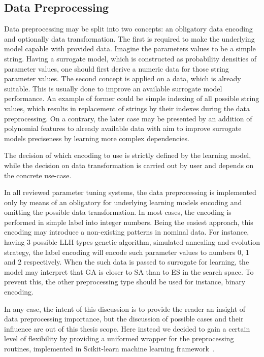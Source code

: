 \subsection{Data Preprocessing}\label{impl: preprocessing}
Data preprocessing may be split into two concepts: an obligatory data encoding and optionally data transformation. The first is required to make the underlying model capable with provided data. Imagine the parameters values to be a simple string. Having a surrogate model, which is constructed as probability densities of parameter values, one should first derive a numeric data for those string parameter values. The second concept is applied on a data, which is already suitable. This is usually done to improve an available surrogate model performance. An example of former could be simple indexing of all possible string values, which results in replacement of strings by their indexes during the data preprocessing. On a contrary, the later case may be presented by an addition of polynomial features to already available data with aim to improve surrogate models preciseness by learning more complex dependencies.

The decision of which encoding to use is strictly defined by the learning model, while the decision on data transformation is carried out by user and depends on the concrete use-case.

In all reviewed parameter tuning systems, the data preprocessing is implemented only by means of an obligatory for underlying learning models encoding and omitting the possible data transformation. In most cases, the encoding is performed in simple label into integer numbers. Being the easiest approach, this encoding may introduce a non-existing patterns in nominal data. For instance, having 3 possible LLH types genetic algorithm, simulated annealing and evolution strategy, the label encoding will encode such parameter values to numbers 0, 1 and 2 respectively. When the such data is passed to surrogate for learning, the model may interpret that GA is closer to SA than to ES in the search space. To prevent this, the other preprocessing type should be used for instance, binary encoding.

In any case, the intent of this discussion is to provide the reader an insight of data preprocessing importance, but the discussion of possible cases and their influence are out of this thesis scope. Here instead we decided to gain a certain level of flexibility by providing a uniformed wrapper for the preprocessing routines, implemented in Scikit-learn machine learning framework~\cite{scikit-learn}.

